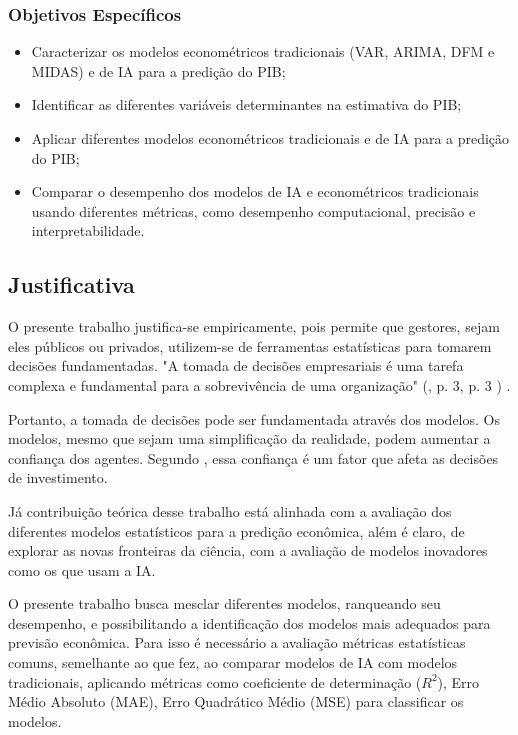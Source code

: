 \documentclass[12pt]{article}%
\newcommand{\citem}[2][]{%
	(\citeauthoronline{#2}, \citeyear{#2}%
	\ifx#1\empty\else, #1\fi%
	)%
}
\begin{document}
	\subsubsection{Objetivos Específicos}
	\begin{itemize}
		\item[a)] Caracterizar os modelos econométricos tradicionais (VAR, ARIMA, DFM e MIDAS) e de IA para a predição do PIB;
		\item[b)] Identificar as diferentes variáveis determinantes na estimativa do PIB;
		\item[c)] Aplicar diferentes modelos econométricos tradicionais e de IA para a predição do PIB; 
		\item[d)] Comparar o desempenho dos modelos de IA e econométricos tradicionais usando diferentes métricas, como desempenho computacional, precisão e interpretabilidade.
	\end{itemize}
	

	
	\subsection{Justificativa} 
	O presente trabalho justifica-se empiricamente, pois permite que gestores, sejam eles públicos ou privados, utilizem-se de ferramentas estatísticas para tomarem decisões fundamentadas. "A  tomada  de  decisões  empresariais  é  uma  tarefa  complexa  e  fundamental  para  a  sobrevivência de uma organização" \citem[p. 3]{santana2023aprimorando}.
	
	Portanto, a tomada de decisões pode ser fundamentada através dos modelos. Os modelos, mesmo que sejam uma simplificação da realidade, podem aumentar a confiança dos agentes. Segundo , essa confiança é um fator que afeta as decisões de investimento.
	
	Já contribuição teórica desse trabalho está alinhada com a avaliação dos diferentes modelos estatísticos para a predição econômica, além é claro, de explorar as novas fronteiras da ciência, com a avaliação de modelos inovadores como os que usam a IA. 
	
	
	O presente trabalho busca mesclar diferentes modelos, ranqueando seu desempenho, e possibilitando a identificação dos modelos mais adequados para previsão econômica. Para isso é necessário a avaliação métricas estatísticas comuns, semelhante ao que  fez, ao comparar modelos de IA com modelos tradicionais, aplicando métricas como coeficiente de determinação ($R^2$), Erro Médio Absoluto (MAE), Erro Quadrático Médio (MSE) para classificar os modelos.
	\newpage
	
\end{document}
